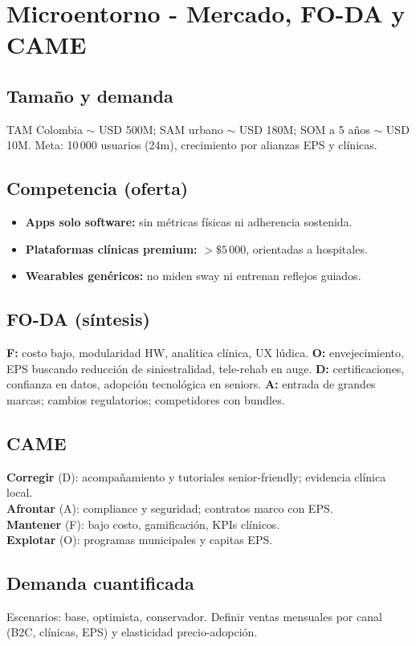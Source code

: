 \section{Microentorno - Mercado, FO-DA y CAME}
\subsection{Tamaño y demanda}
TAM Colombia $\sim$ USD 500M; SAM urbano $\sim$ USD 180M; SOM a 5 años $\sim$ USD 10M. Meta: 10\,000 usuarios (24m), crecimiento por alianzas EPS y clínicas.

\subsection{Competencia (oferta)}
\begin{itemize}
\item \textbf{Apps solo software:} sin métricas físicas ni adherencia sostenida.
\item \textbf{Plataformas clínicas premium:} $>\$5\,000$, orientadas a hospitales.
\item \textbf{Wearables genéricos:} no miden sway ni entrenan reflejos guiados.
\end{itemize}

\subsection{FO-DA (síntesis)}
\textbf{F:} costo bajo, modularidad HW, analítica clínica, UX lúdica. 
\textbf{O:} envejecimiento, EPS buscando reducción de siniestralidad, tele-rehab en auge. 
\textbf{D:} certificaciones, confianza en datos, adopción tecnológica en seniors. 
\textbf{A:} entrada de grandes marcas; cambios regulatorios; competidores con bundles.

\subsection{CAME}
\textbf{Corregir} (D): acompañamiento y tutoriales senior-friendly; evidencia clínica local.\\
\textbf{Afrontar} (A): compliance y seguridad; contratos marco con EPS.\\
\textbf{Mantener} (F): bajo costo, gamificación, KPIs clínicos.\\
\textbf{Explotar} (O): programas municipales y capitas EPS.

\subsection{Demanda cuantificada}
Escenarios: base, optimista, conservador. Definir ventas mensuales por canal (B2C, clínicas, EPS) y elasticidad precio-adopción.
